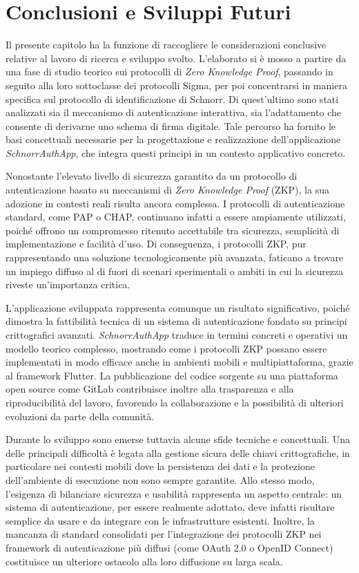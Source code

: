 \chapter{Conclusioni e Sviluppi Futuri}

Il presente capitolo ha la funzione di raccogliere le considerazioni conclusive relative al lavoro di ricerca e sviluppo svolto. L'elaborato si è mosso a partire da una fase di studio teorico sui protocolli di \textit{Zero Knowledge Proof}, passando in seguito alla loro sottoclasse dei protocolli Sigma, per poi concentrarsi in maniera specifica sul protocollo di identificazione di Schnorr. Di quest'ultimo sono stati analizzati sia il meccanismo di autenticazione interattiva, sia l'adattamento che consente di derivarne uno schema di firma digitale. Tale percorso ha fornito le basi concettuali necessarie per la progettazione e realizzazione dell'applicazione \textit{SchnorrAuthApp},
che integra questi principi in un contesto applicativo concreto.

Nonostante l'elevato livello di sicurezza garantito da un protocollo di autenticazione basato su meccanismi di \textit{Zero Knowledge Proof} (ZKP), la sua adozione in contesti reali risulta ancora complessa. I protocolli di autenticazione standard, come PAP o CHAP, continuano infatti a essere ampiamente utilizzati, poiché offrono un compromesso ritenuto accettabile tra sicurezza, semplicità di implementazione e facilità d'uso. Di conseguenza, i protocolli ZKP, pur rappresentando una soluzione tecnologicamente più avanzata, faticano a trovare un impiego diffuso al di fuori di scenari sperimentali o ambiti in cui la sicurezza riveste un'importanza critica.

L'applicazione sviluppata rappresenta comunque un risultato significativo, poiché dimostra la fattibilità tecnica di un sistema di autenticazione fondato su principi crittografici avanzati. \textit{SchnorrAuthApp} traduce in termini concreti e operativi un modello teorico complesso, mostrando come i protocolli ZKP possano essere implementati in modo efficace anche in ambienti mobili e multipiattaforma, grazie al framework Flutter. La pubblicazione del codice sorgente su una piattaforma open source come GitLab contribuisce inoltre alla trasparenza e alla riproducibilità del lavoro, favorendo la collaborazione e la possibilità di ulteriori evoluzioni da parte della comunità.

Durante lo sviluppo sono emerse tuttavia alcune sfide tecniche e concettuali. Una delle principali difficoltà è legata alla gestione sicura delle chiavi crittografiche, in particolare nei contesti mobili dove la persistenza dei dati e la protezione dell'ambiente di esecuzione non sono sempre garantite. Allo stesso modo, l'esigenza di bilanciare sicurezza e usabilità rappresenta un aspetto centrale: un sistema di autenticazione, per essere realmente adottato, deve infatti risultare semplice da usare e da integrare con le infrastrutture esistenti. Inoltre, la mancanza di standard consolidati per l'integrazione dei protocolli ZKP nei framework di autenticazione più diffusi (come OAuth 2.0 o OpenID Connect) costituisce un ulteriore ostacolo alla loro diffusione su larga scala.

